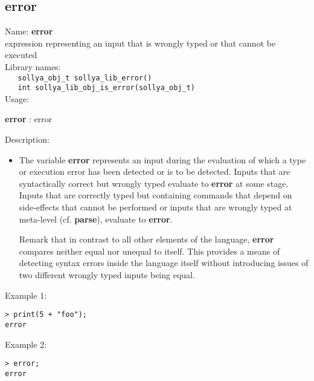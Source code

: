 \subsection{error}
\label{laberror}
\noindent Name: \textbf{error}\\
\phantom{aaa}expression representing an input that is wrongly typed or that cannot be executed\\[0.2cm]
\noindent Library names:\\
\verb|   sollya_obj_t sollya_lib_error()|\\
\verb|   int sollya_lib_obj_is_error(sollya_obj_t)|\\[0.2cm]
\noindent Usage: 
\begin{center}
\textbf{error} : \textsf{error}\\
\end{center}
\noindent Description: \begin{itemize}

\item The variable \textbf{error} represents an input during the evaluation of
   which a type or execution error has been detected or is to be
   detected. Inputs that are syntactically correct but wrongly typed
   evaluate to \textbf{error} at some stage.  Inputs that are correctly typed
   but containing commands that depend on side-effects that cannot be
   performed or inputs that are wrongly typed at meta-level (cf. \textbf{parse}),
   evaluate to \textbf{error}.
    
   Remark that in contrast to all other elements of the \sollya language,
   \textbf{error} compares neither equal nor unequal to itself. This provides a
   means of detecting syntax errors inside the \sollya language itself
   without introducing issues of two different wrongly typed inputs being
   equal.
\end{itemize}
\noindent Example 1: 
\begin{center}\begin{minipage}{15cm}\begin{Verbatim}[frame=single]
> print(5 + "foo");
error
\end{Verbatim}
\end{minipage}\end{center}
\noindent Example 2: 
\begin{center}\begin{minipage}{15cm}\begin{Verbatim}[frame=single]
> error;
error
\end{Verbatim}
\end{minipage}\end{center}
